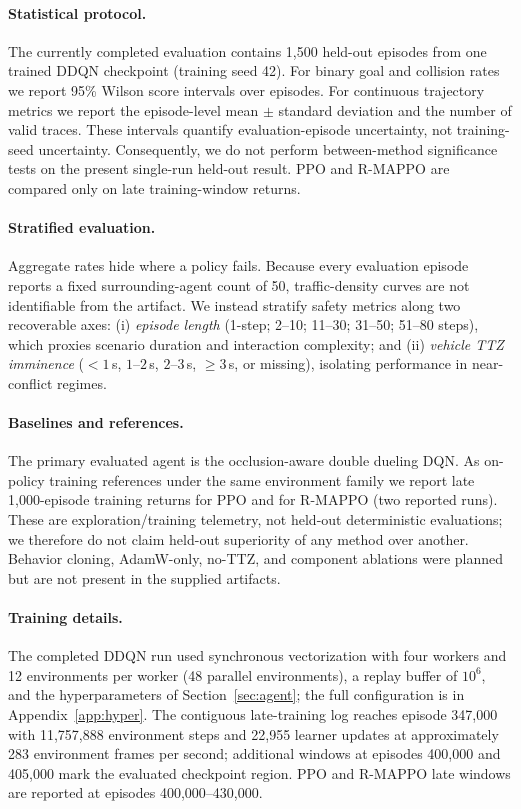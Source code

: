 \documentclass{article}
\begin{document}
\paragraph{Statistical protocol.}
The currently completed evaluation contains 1{,}500 held-out episodes from
one trained DDQN checkpoint (training seed 42). For binary goal and collision
rates we report 95\% Wilson score intervals over episodes. For continuous
trajectory metrics we report the episode-level mean $\pm$ standard
deviation and the number of valid traces. These intervals quantify
evaluation-episode uncertainty, not training-seed uncertainty. Consequently,
we do not perform between-method significance tests on the present single-run
held-out result. PPO and R-MAPPO are compared only on late training-window
returns.

\paragraph{Stratified evaluation.}
Aggregate rates hide where a policy fails. Because every evaluation episode
reports a fixed surrounding-agent count of 50, traffic-density curves are not
identifiable from the artifact. We instead stratify safety metrics along two
recoverable axes: (i) \emph{episode length} (1-step; 2--10; 11--30; 31--50;
51--80 steps), which proxies scenario duration and interaction complexity;
and (ii) \emph{vehicle TTZ imminence} ($<1$\,s, $1$--$2$\,s, $2$--$3$\,s,
$\ge 3$\,s, or missing), isolating performance in near-conflict regimes.

\paragraph{Baselines and references.}
The primary evaluated agent is the occlusion-aware double dueling DQN. As
on-policy training references under the same environment family we report late
1{,}000-episode training returns for PPO and for R-MAPPO (two reported runs).
These are exploration/training telemetry, not held-out deterministic
evaluations; we therefore do not claim held-out superiority of any method
over another. Behavior cloning, AdamW-only, no-TTZ, and component ablations
were planned but are not present in the supplied artifacts.

\paragraph{Training details.}
The completed DDQN run used synchronous vectorization with four workers and
12 environments per worker (48 parallel environments), a replay buffer of
$10^6$, and the hyperparameters of Section~\ref{sec:agent}; the full
configuration is in Appendix~\ref{app:hyper}. The contiguous late-training
log reaches episode 347{,}000 with 11{,}757{,}888 environment steps and
22{,}955 learner updates at approximately 283 environment frames per second;
additional windows at episodes 400{,}000 and 405{,}000 mark the evaluated
checkpoint region. PPO and R-MAPPO late windows are reported at episodes
400{,}000--430{,}000.
\end{document}
